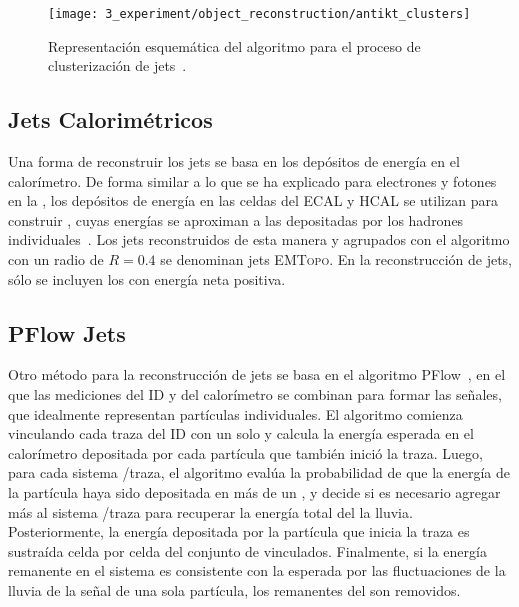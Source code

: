 \begin{figure}[ht!]
    \centering
    \texttt{[image: 3\_experiment/object\_reconstruction/antikt\_clusters]}
    \caption{Representaci\'on esquem\'atica del algoritmo \antikt para el proceso de clusterizaci\'on de jets~\cite{AntiKtAlgorithm}.}
    \label{fig:objects:jets:antikt}
\end{figure}

\subsection{Jets Calorim\'etricos}

Una forma de reconstruir los jets se basa en los depósitos de energía en el calorímetro. De forma similar a lo que se ha explicado para electrones y fotones en la \Sect{\ref{subsec:objects:egamma:reco}}, los depósitos de energía en las celdas del \ac{ECAL} y \ac{HCAL} se utilizan para construir \topos, cuyas energ\'ias se aproximan a las depositadas por los hadrones individuales~\cite{ATLAS-TopoClusters-Run1,ATLAS-TopoClusters-Run2}. Los jets reconstruidos de esta manera y agrupados con el algoritmo \antikt con un radio de \(R=0.4\) se denominan jets \textsc{EMTopo}. En la reconstrucción de jets, sólo se incluyen los \topos con energía neta positiva.

\subsection{\acf{PFlow} Jets}

Otro m\'etodo para la reconstrucci\'on de jets se basa en el algoritmo \ac{PFlow}~\cite{ATLAS-JetPFlow-Performance}, en el que las mediciones del \ac{ID} y del calorímetro se combinan para formar las señales, que idealmente representan partículas individuales. El algoritmo comienza vinculando cada traza del \ac{ID} con un solo \topo y calcula la energ\'ia esperada en el calor\'imetro depositada por cada part\'icula que tambi\'en inici\'o la traza. Luego, para cada sistema \topo/traza, el algoritmo eval\'ua la probabilidad de que la energ\'ia de la part\'icula haya sido depositada en m\'as de un \topo, y decide si es necesario agregar m\'as \topos al sistema \topo/traza para recuperar la energ\'ia total del la lluvia. Posteriormente, la energ\'ia depositada por la part\'icula que inicia la traza es sustra\'ida celda por celda del conjunto de \topos vinculados. Finalmente, si la energ\'ia remanente en el sistema es consistente con la esperada por las fluctuaciones de la lluvia de la se\~nal de una sola part\'icula, los remanentes del \topo son removidos.

